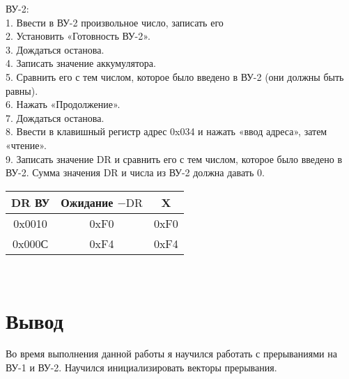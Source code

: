 \noindent ВУ-2: \\ 
1. Ввести в ВУ-2 произвольное число, записать его \\
2. Установить «Готовность ВУ-2». \\
3. Дождаться останова. \\
4. Записать значение аккумулятора. \\
5. Сравнить его с тем числом, которое было введено в ВУ-2 (они должны быть равны). \\
6. Нажать «Продолжение». \\
7. Дождаться останова. \\
8. Ввести в клавишный регистр адрес 0x034 и нажать «ввод адреса», затем «чтение». \\
9. Записать значение DR и сравнить его с тем числом, которое было введено в ВУ-2. Сумма значения DR и числа из ВУ-2 должна давать 0. \\

\begin{tabular}{|c|c|c|}
\hline
DR ВУ & Ожидание $-\text{DR}$ & X \\
\hline
0x0010 & 0xF0 & 0xF0 \\
\hline
0x000С & 0xF4 & 0xF4 \\
\hline
\end{tabular} \\
\section{Вывод}
Во время выполнения данной работы я научился работать с прерываниями на ВУ-1 и ВУ-2. Научился инициализировать векторы прерывания.


